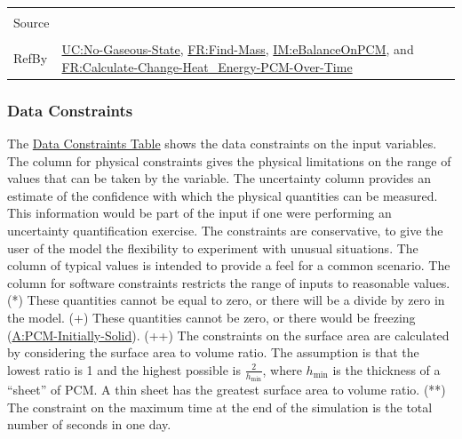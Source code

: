 \documentclass[12pt]{article}
\begin{document}
\begin{minipage}{\textwidth}
\begin{tabular}{>{\raggedright}p{}>{\raggedright\arraybackslash}p{}}
\\ \midrule \\
Source & \cite{koothoor2013}
         
\\ \midrule \\
RefBy & \hyperref[unlikeChgNGS]{UC:No-Gaseous-State}, \hyperref[findMass]{FR:Find-Mass}, \hyperref[IM:eBalanceOnPCM]{IM:eBalanceOnPCM}, and \hyperref[calcChgHeatEnergyPCMOverTime]{FR:Calculate-Change-Heat\_Energy-PCM-Over-Time}
        
\\ \bottomrule
\end{tabular}
\end{minipage}

\subsubsection{Data Constraints}
\label{Sec:DataConstraints}
The \hyperref[Table:InDataConstraints]{Data Constraints Table} shows the data constraints on the input variables. The column for physical constraints gives the physical limitations on the range of values that can be taken by the variable. The uncertainty column provides an estimate of the confidence with which the physical quantities can be measured. This information would be part of the input if one were performing an uncertainty quantification exercise. The constraints are conservative, to give the user of the model the flexibility to experiment with unusual situations. The column of typical values is intended to provide a feel for a common scenario. The column for software constraints restricts the range of inputs to reasonable values. (*) These quantities cannot be equal to zero, or there will be a divide by zero in the model. (+) These quantities cannot be zero, or there would be freezing (\hyperref[assumpPIS]{A:PCM-Initially-Solid}). (++) The constraints on the surface area are calculated by considering the surface area to volume ratio. The assumption is that the lowest ratio is 1 and the highest possible is $\frac{2}{{h_{\text{min}}}}$, where ${h_{\text{min}}}$ is the thickness of a ``sheet'' of PCM. A thin sheet has the greatest surface area to volume ratio. (**) The constraint on the maximum time at the end of the simulation is the total number of seconds in one day.
\end{document}
